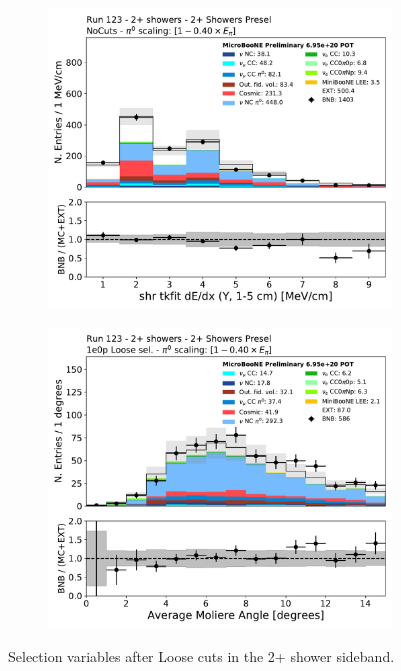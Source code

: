 \begin{figure}[H]
\begin{center}
\begin{subfigure}{0.4\textwidth}
    \end{subfigure} \\
    \begin{subfigure}{0.4\textwidth}
    \includegraphics[width=1.00\textwidth]{Sidebands/Figures/TwoShr_1e0pSel_newSamples/shr_tkfit_gap10_dedx_Y_loose.pdf}
    \end{subfigure}
    \begin{subfigure}{0.4\textwidth}
    \includegraphics[width=1.00\textwidth]{Sidebands/Figures/TwoShr_1e0pSel_newSamples/shrmoliereavg_loose.pdf}
    \end{subfigure}
    \caption{\label{fig:sb:1eZp:twopshr:loose:vars1} Selection variables after \zpsel Loose cuts in the 2+ shower sideband.}
    \end{center}
\end{figure}


